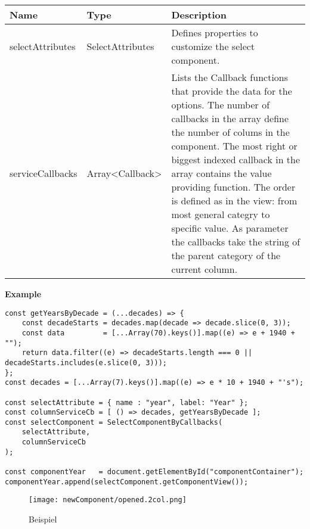 \begin{table}[!htb] 
    \label{api:selectComponentByCallbacksParameter}
    \footnotesize
    \setlength\extrarowheight{4pt}
    \begin{tabular}{ p{3.5cm} p{3.5cm} p{6cm} }
        \toprule[1.2pt]
        \textbf{Name}    & \textbf{Type}    & \textbf{Description} \\
        \midrule
        selectAttributes & SelectAttributes & Defines properties to customize the select component. \\
        serviceCallbacks & Array<Callback>  & Lists the Callback functions that provide the data for the options. 
                                              The number of callbacks in the array define the number of colums in the component. 
                                              The most right or biggest indexed callback in the array contains the value providing function. 
                                              The order is defined as in the view: from most general categry to specific value. 
                                              As parameter the callbacks take the string of the parent category of the current column. \\
        \bottomrule[1.2pt]
    \end{tabular}
\end{table}

\vspace*{6pt}
\noindent
\textbf{Example}

\begin{lstlisting}[style = htmlcssjs, label = api:selectComponentCbExample]
const getYearsByDecade = (...decades) => {
    const decadeStarts = decades.map(decade => decade.slice(0, 3));
    const data         = [...Array(70).keys()].map((e) => e + 1940 + "");
    return data.filter((e) => decadeStarts.length === 0 || decadeStarts.includes(e.slice(0, 3)));
};
const decades = [...Array(7).keys()].map((e) => e * 10 + 1940 + "'s");

const selectAttribute = { name : "year", label: "Year" };
const columnServiceCb = [ () => decades, getYearsByDecade ];
const selectComponent = SelectComponentByCallbacks(
    selectAttribute,
    columnServiceCb
);

const componentYear   = document.getElementById("componentContainer");
componentYear.append(selectComponent.getComponentView());
\end{lstlisting}
    
\begin{figure}[!htb]
    \centering
    \texttt{[image: newComponent/opened.2col.png]}
    \caption*{\centering Beispiel }
    \label{api:selectComponentCbImg}
\end{figure}


